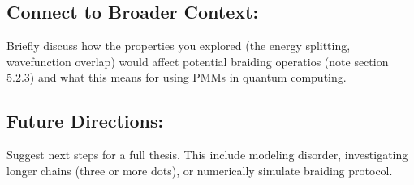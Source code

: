 \documentclass[11pt, letterpaper, titlepage]{article}
\begin{document}
\subsection{Connect to Broader Context:} Briefly discuss how the properties you explored (the energy splitting, wavefunction overlap) would affect potential braiding operatios (note section 5.2.3) and what this means for using PMMs in quantum computing.\\
\subsection{Future Directions:} Suggest next steps for a full thesis. This include modeling disorder, investigating longer chains (three or more dots), or numerically simulate braiding protocol.
\end{document}
